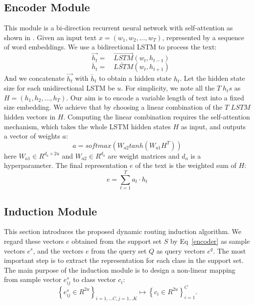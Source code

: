 \documentclass[11pt,a4paper]{article}
\begin{document}
\subsection{Encoder Module}
This module is a bi-direction recurrent neural network with self-attention as shown in \citet{lin2017structured}. Given an input text $x=(w_1,w_2,...,w_T)$, represented by a sequence of word embeddings. We use a bidirectional LSTM to process the text:
\begin{equation}
\quad\overrightarrow{h_t}=\quad\overrightarrow{LSTM}(w_t, h_{t-1})
\end{equation}
\begin{equation}
\quad\overleftarrow{h_t}=\quad\overleftarrow{LSTM}(w_t, h_{t+1})
\end{equation}
And we concatenate $\overrightarrow{h_t}$ with $\overleftarrow{h_t}$ to obtain a hidden state $h_t$. Let the hidden state size for each unidirectional LSTM be $u$.
For simplicity, we note all the $T\;h_ts$ as $H=(h_1, h_2,...,h_T)$. Our aim is to encode a variable length of text into a fixed size embedding. We achieve that by choosing a linear combination of the $T$ $LSTM$ hidden vectors in $H$. Computing the linear combination requires the self-attention mechanism, which takes the whole LSTM hidden states $H$ as input, and outputs a vector of weights $a$:
\begin{equation}
    a=softmax(W_{a2}tanh(W_{a1}H^T))
\end{equation}
here $W_{a1} \in R^{d_a \times 2u}$ and $W_{a2} \in R^{d_a}$ are weight matrices and $d_a$ is a hyperparameter. The final representation $e$ of the text is the weighted sum of $H$:
\begin{equation}
    e = \sum_{t=1}^T{a_t\cdot h_t}
    \label{encoder}
\end{equation}

\subsection{Induction Module}
This section introduces the proposed dynamic routing induction algorithm. We regard these vectors $e$ obtained from the support set $S$ by Eq~\ref{encoder} as sample vectors $e^s$, and the vectors $e$ from the query set $Q$ as query vectors $e^q$. The most important step is to extract the representation for each class in the support set. The main purpose of the induction module is to design a non-linear mapping from sample vector ${e}_{ij}^s$ to class vector $c_i$:\\
\[{\left\{ {{{e}_{ij}^s} \in {R^{2u}}} \right\}_{i = 1,...C,j = 1...K}} \mapsto \left\{ {{c_i} \in {R^{2u}}} \right\}_{i = 1}^C.\]
\end{document}
